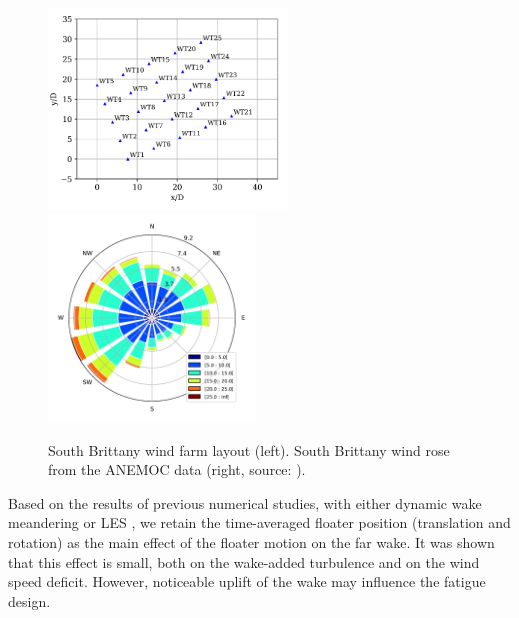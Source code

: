 \begin{figure}[h]
\centering
\includegraphics[width=15pc]{part2/figures/WAKE/SB1.png}
\includegraphics[width=13pc]{part2/figures/WAKE/SB2.png}\hspace{2pc}
\caption{\label{fig:SB-farm} 
South Brittany wind farm layout (left). South Brittany wind rose from the ANEMOC data (right, source: \cite{Ardillon2023}).}
\end{figure}

Based on the results of previous numerical studies, with either dynamic wake meandering \cite{Wise2020} or LES \cite{Johlas2021}, we retain the time-averaged floater position (translation and rotation) as the main effect of the floater motion on the far wake. It was shown that this effect is small, both on the wake-added turbulence and on the wind speed deficit. However, noticeable uplift of the wake may influence the fatigue design. 

